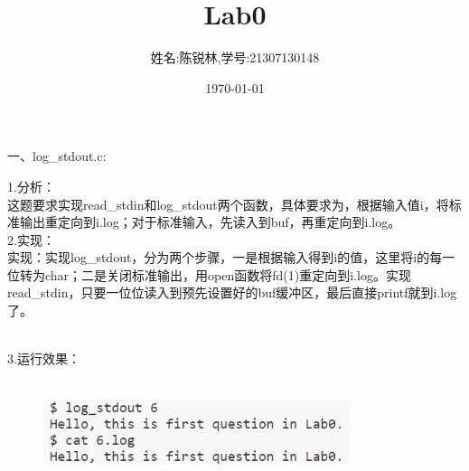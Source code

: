 \documentclass[12pt]{article}
\title{Lab0}
\author{姓名:陈锐林,学号:21307130148}
\date{\today}
\begin{document}
\maketitle
\begin{large}
    \noindent 一、log\_stdout.c:\\
\end{large}
1.分析：\\
\hspace*{2em}这题要求实现read\_stdin和log\_stdout两个函数，具体要求为，根据输入值i，将标准输出重定向到i.log；对于标准输入，先读入到buf，再重定向到i.log。\\
2.实现：\\
\hspace*{2em}实现：实现log\_stdout，分为两个步骤，一是根据输入得到i的值，这里将i的每一位转为char；二是关闭标准输出，用open函数将fd(1)重定向到i.log。实现read\_stdin，只要一位位读入到预先设置好的buf缓冲区，最后直接printf就到i.log了。
\begin{figure}[!h]
    \centering
    \hfill
\end{figure}\\
3.运行效果：
\begin{figure}[h]
    \centering
    \includegraphics[width=9cm,height=3cm]{lab0-3.jpg}
\end{figure}
\end{document}
